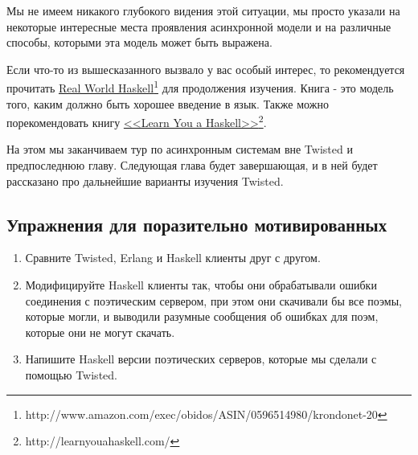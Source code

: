 Мы не имеем никакого глубокого видения этой ситуации, мы просто 
указали на некоторые интересные места проявления асинхронной 
модели и на различные способы, которыми эта модель может быть выражена.


Если что-то из вышесказанного вызвало у вас особый интерес, 
то рекомендуется прочитать  
\href{http://www.amazon.com/exec/obidos/ASIN/0596514980/krondonet-20}{Real World Haskell}\footnote[1]{http://www.amazon.com/exec/obidos/ASIN/0596514980/krondonet-20} 
для продолжения изучения. Книга - это модель того, каким должно 
быть хорошее введение в язык. Также можно порекомендовать книгу 
\href{http://learnyouahaskell.com/}{<<Learn You a Haskell>>}\footnote[2]{http://learnyouahaskell.com/}.  


На этом мы заканчиваем тур по асинхронным системам вне Twisted и предпоследнюю 
главу. Следующая глава будет завершающая, и в ней будет рассказано про 
дальнейшие варианты изучения Twisted. 


\subsection{Упражнения для поразительно мотивированных}

\begin{enumerate}

\item Сравните Twisted, Erlang и Haskell клиенты друг с другом.

\item Модифицируйте Haskell клиенты так, чтобы они обрабатывали 
ошибки соединения с поэтическим сервером, при этом они скачивали бы 
все поэмы, которые могли, и выводили разумные сообщения об ошибках для 
поэм, которые они не могут скачать.

\item Напишите Haskell версии поэтических серверов, которые 
мы сделали с помощью Twisted.

\end{enumerate}



